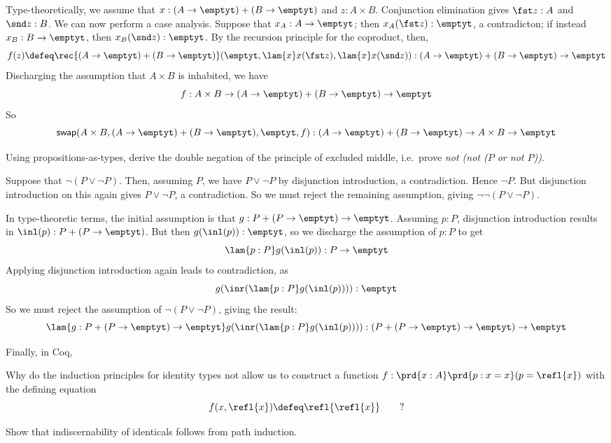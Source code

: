 Type-theoretically, we assume that $x : (A \to\emptyt) + (B \to\emptyt)$ and $z
: A \times B$.  Conjunction elimination gives $\fst z : A$ and $\snd z : B$.
We can now perform a case analysis.  Suppose that $x_{A} : A \to \emptyt$; then
$x_{A}(\fst z) : \emptyt$, a contradicton; if instead $x_{B} : B \to \emptyt$,
then $x_{B}(\snd z) : \emptyt$.  By the recursion principle for the coproduct,
then,
\[
  f(z) \defeq \rec{(A\to\emptyt)+(B\to\emptyt)}(
    \emptyt,
    \lam{x}x(\fst z),
    \lam{x}x(\snd z)
  )
  :
  (A \to \emptyt) + (B \to \emptyt) \to \emptyt
\]
Discharging the assumption that $A \times B$ is inhabited, we have
\[
  f : 
  A \times B \to (A \to \emptyt) + (B \to \emptyt) \to \emptyt
\]
So
\[
  \mathsf{swap}(A\times B, (A\to\emptyt)+(B\to\emptyt), \emptyt, f)
  :
  (A \to \emptyt) + (B \to \emptyt) 
  \to 
  A \times B 
  \to \emptyt
\]



  Using propositions-as-types, derive the double negation of the
principle of excluded middle, i.e.~prove \emph{not (not ($P$ or not $P$))}.

\soln  Suppose that $\lnot(P \lor \lnot P)$.  Then, assuming $P$, we have
$P \lor \lnot P$ by disjunction introduction, a contradiction.  Hence
$\lnot P$.  But disjunction introduction on this again gives $P \lor \lnot P$,
a contradiction.  So we must reject the remaining assumption, giving
$\lnot\lnot(P \lor \lnot P)$.

In type-theoretic terms, the initial assumption is that $g : P + (P \to
\emptyt) \to \emptyt$.  Assuming $p : P$, disjunction introduction results in
$\inl(p) : P + (P \to \emptyt)$.  But then $g(\inl(p)) : \emptyt$, so we
discharge the assumption of $p : P$ to get
\[
  \lam{p:P}g(\inl(p)) : P \to \emptyt
\]
Applying disjunction introduction again leads to contradiction, as
\[
  g(\inr(\lam{p:P}g(\inl(p)))) : \emptyt
\]
So we must reject the assumption of $\lnot( P \lor \lnot P)$, giving the
result:
\[
  \lam{g:P + (P \to \emptyt) \to \emptyt}g(\inr(\lam{p:P}g(\inl(p)))) 
  : 
  (P + (P \to \emptyt) \to \emptyt) \to \emptyt
\]

Finally, in Coq,


  Why do the induction principles for identity types not allow
us to construct a function $f : \prd{x:A}\prd{p:x=x}(p = \refl{x})$ with the
defining equation
\[
  f(x, \refl{x}) \defeq \refl{\refl{x}}\qquad?
\]

 Show that indiscernability of identicals follows from path
induction.

